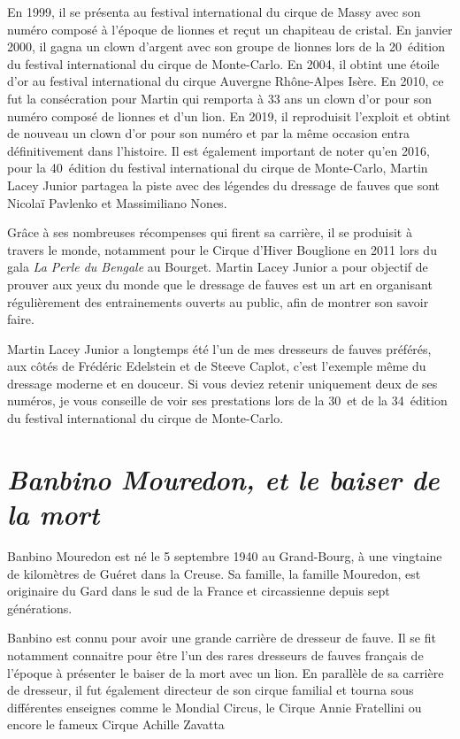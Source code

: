 En 1999, il se présenta au festival international du cirque de Massy avec son numéro composé à l'époque de lionnes et reçut un chapiteau de cristal. En janvier 2000, il gagna un clown d'argent avec son groupe de lionnes lors de la 20\ieme~édition du festival international du cirque de Monte-Carlo. En 2004, il obtint une étoile d'or au festival international du cirque Auvergne Rhône-Alpes Isère. En 2010, ce fut la consécration pour Martin qui remporta à 33 ans un clown d'or pour son numéro composé de lionnes et d’un lion. En 2019, il reproduisit l'exploit et obtint de nouveau un clown d'or pour son numéro et par la même occasion entra définitivement dans l'histoire. Il est également important de noter qu'en 2016, pour la 40\ieme~édition du festival international du cirque de Monte-Carlo, Martin Lacey Junior partagea la piste avec des légendes du dressage de fauves que sont Nicolaï Pavlenko et Massimiliano Nones.

Grâce à ses nombreuses récompenses qui firent sa carrière, il se produisit à travers le monde, notamment pour le Cirque d'Hiver Bouglione en 2011 lors du gala \textit{La Perle du Bengale} au Bourget. Martin Lacey Junior a pour objectif de prouver aux yeux du monde que le dressage de fauves est un art en organisant régulièrement des entrainements ouverts au public, afin de montrer son savoir faire.

Martin Lacey Junior a longtemps été l'un de mes dresseurs de fauves préférés, aux côtés de Frédéric Edelstein et de Steeve Caplot, c'est l'exemple même du dressage moderne et en douceur. Si vous deviez retenir uniquement deux de ses numéros, je vous conseille de voir ses prestations lors de la 30\ieme~et de la 34\ieme~édition du festival international du cirque de Monte-Carlo.

\section*{\textit{Banbino Mouredon, et le baiser de la mort}}
{}
\noindent
Banbino Mouredon est né le 5 septembre 1940 au Grand-Bourg, à une vingtaine de kilomètres de Guéret dans la Creuse. Sa famille, la famille Mouredon, est originaire du Gard dans le sud de la France et circassienne depuis sept générations.

Banbino est connu pour avoir une grande carrière de dresseur de fauve. Il se fit notamment connaitre pour être l'un des rares dresseurs de fauves français de l'époque à présenter le baiser de la mort avec un lion. En parallèle de sa carrière de dresseur, il fut également directeur de son cirque familial et tourna sous différentes enseignes comme le Mondial Circus, le Cirque Annie Fratellini ou encore le fameux Cirque Achille Zavatta

